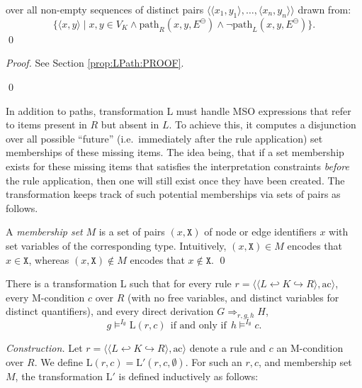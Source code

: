 \documentclass{llncs}
\begin{document}
\noindent over all non-empty sequences of distinct pairs $\langle \langle x_1,y_1 \rangle, \dots, \langle x_n,y_n \rangle \rangle$ drawn from:
\[ \{\langle x,y \rangle \mid x,y\in V_K \wedge \text{path}_R(x,y,E^\ominus) \wedge \neg \text{path}_L(x,y,E^\ominus)\}. \]
	\qed
	
\begin{proof}
	See Section \ref{prop:LPath:PROOF}.
	
	\qed
\end{proof}

In addition to paths, transformation L must handle MSO expressions that refer to items present in $R$ but absent in $L$. To achieve this, it computes a disjunction over all possible ``future'' (i.e.\ immediately after the rule application) set memberships of these missing items. The idea being, that if a set membership exists for these missing items that satisfies the interpretation constraints \emph{before} the rule application, then one will still exist once they have been created. The transformation keeps track of such potential memberships via sets of pairs as follows.


\begin{definition}\rm
	A \emph{membership set} $M$ is a set of pairs $(x,\mathtt{X})$ of node or edge identifiers $x$ with set variables of the corresponding type. Intuitively, $(x,\mathtt{X}) \in M$ encodes that $x\in\mathtt{X}$, whereas $(x,\mathtt{X}) \notin M$ encodes that $x\notin\mathtt{X}$.
	\qed
\end{definition}

\begin{theorem}\label{thm:L}\rm
	There is a transformation L such that for every rule $r = \langle \langle L \hookleftarrow K \hookrightarrow R \rangle, \text{ac} \rangle$, every M-condition $c$ over $R$ (with no free variables, and distinct variables for distinct quantifiers), and every direct derivation $G\Rightarrow_{r,g,h} H$,
	\[ g \models^{I_\emptyset} \text{L}(r,c)\ \ \text{if and only if}\ \ h \models^{I_\emptyset} c. \]
\end{theorem}
	
	\noindent \emph{Construction.} Let $r = \langle \langle L \hookleftarrow K \hookrightarrow R \rangle, \text{ac} \rangle$ denote a rule and $c$ an M-condition over $R$. We define $\text{L}(r,c) = \text{L}'(r,c,\emptyset)$. For such an $r,c$, and membership set $M$, the transformation $\text{L}'$ is defined inductively as follows:
	
\end{document}
